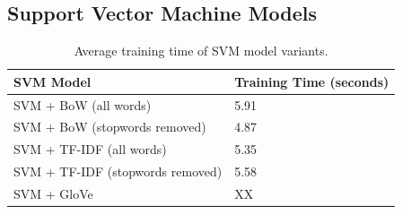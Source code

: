 \documentclass[a4paper,twoside,phd]{BYUPhys}
\begin{document}
\subsection{Support Vector Machine Models}
\label{sec:TrainingTimeSVM}

\begin{table}[]
	\centering
	
	\begin{tabular}{|p{4.4cm}|p{5cm}|}
		\hline
		
		\textbf{SVM Model} & \textbf{Training Time (seconds)}                                                                                                                                                                                                                                                                                                                                                    \\
		\hline                                                                                                                                              
		
		SVM + BoW  (all words)  & 5.91  \\
		\hline
		
		SVM + BoW \newline (stopwords removed)  & 4.87  \\
		\hline
		
		SVM + TF-IDF \newline (all words) & 5.35 \\
		\hline
		
		SVM + TF-IDF \newline (stopwords removed) & 5.58 \\
		\hline
		
		SVM + GloVe & XX \\
		\hline
		
		
	\end{tabular}
	\caption{Average training time of SVM model variants.}
	\label{table:SVMTrainingTime}
\end{table}
\end{document}
